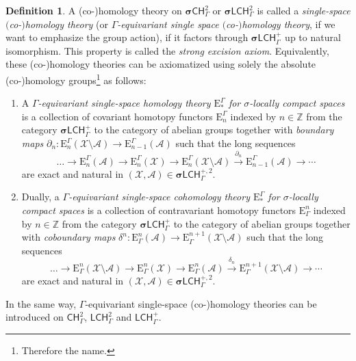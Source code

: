 \documentclass[pdftex]{sigma}
\numberwithin{equation}{section}
\theoremstyle{definition}
\newtheorem{defn}[thm]{Definition}
\newcommand{\Z}{\mathbb{Z}}
\newcommand{\cX}{\mathcal{X}}
\newcommand{\cA}{\mathcal{A}}
\newcommand{\categoryfont}[1]{\mathsf{#1}}
\newcommand{\sLCHz}[1][\Gamma]{\boldsymbol\sigma\categoryfont{LCH}_{#1}^2}
\newcommand{\sLCHp}[1][\Gamma]{\boldsymbol\sigma\categoryfont{LCH}_{#1}^+}
\newcommand{\sLCHzp}[1][\Gamma]{\boldsymbol\sigma\categoryfont{LCH}_{#1}^{+,2}}
\newcommand{\sCHz}[1][\Gamma]{\boldsymbol\sigma\categoryfont{CH}_{#1}^2}
\newcommand{\LCHz}[1][\Gamma]{\categoryfont{LCH}_{#1}^2}
\newcommand{\LCHp}[1][\Gamma]{\categoryfont{LCH}_{#1}^+}
\newcommand{\CHz}[1][\Gamma]{\categoryfont{CH}_{#1}^2}
\newcommand{\Homol}{\mathrm{E}}
\newcommand{\Cohom}{\mathrm{E}}
\begin{document}
\begin{defn}%
A \mbox{(co-)}homology theory on $\sCHz$ or $\sLCHz$ is called a \emph{single-space \mbox{$($co-$)$}ho\-mo\-lo\-gy theory} (or \emph{$\Gamma$-equivariant single space $($co-$)$ho\-mo\-lo\-gy theory}, if we want to emphasize the group action), if it factors through $\sLCHp$ up to natural isomorphism. This property is called the \emph{strong excision axiom}.
Equivalently, these \mbox{(co-)}homology theories can be axiomatized using solely the absolute \mbox{(co-)}homology groups\footnote{Therefore the name.} as follows:
\begin{enumerate}\itemsep=0pt
\item[$\bullet$] A \emph{$\Gamma$-equivariant single-space homology theory $\Homol^\Gamma_*$ for $\sigma$-locally compact spaces} is a collection of covariant homotopy functors $\Homol^\Gamma_n$ indexed by $n\in\Z$ from the category $\sLCHp$ to the category of abelian groups together with \emph{boundary maps} $\partial_n\colon \Homol^\Gamma_n(\cX\setminus\cA)\to\Homol^\Gamma_{n-1}(\cA)$ such that the long sequences
\begin{equation}\label{eq:ssHomolLES}
\dots\to\Homol^\Gamma_n(\cA)\to\Homol^\Gamma_n(\cX)\to\Homol^\Gamma_n (\cX\setminus\cA)\xrightarrow{\partial_n}\Homol^\Gamma_{n-1}(\cA)\to\cdots
\end{equation}
are exact and natural in $(\cX,\cA)\in\sLCHzp$.
\item[$\bullet$] Dually, a \emph{$\Gamma$-equivariant single-space cohomology theory $\Homol^\Gamma_*$ for $\sigma$-locally compact spaces} is a collection of contravariant homotopy functors $\Cohom_\Gamma^n$ indexed by $n\in\Z$ from the category $\sLCHp$ to the category of abelian groups together with \emph{coboundary maps} $\delta^n\colon \Cohom_\Gamma^n(\cA)\to\Cohom_\Gamma^{n+1}(\cX\setminus\cA)$ such that the long sequences
\begin{equation}\label{eq:ssCohomLES}
\dots\to\Cohom_\Gamma^n(\cX\setminus\cA)\to\Cohom_\Gamma^n(\cX)\to\Cohom_\Gamma^n(\cA)\xrightarrow{\delta_n}\Cohom_\Gamma^{n+1}(\cX\setminus\cA)\to\cdots
\end{equation}
are exact and natural in $(\cX,\cA)\in\sLCHzp$.
\end{enumerate}
In the same way, $\Gamma$-equivariant single-space \mbox{(co-)}homology theories can be introduced on $\CHz$, $\LCHz$ and $\LCHp$.
\end{defn}
\end{document}
